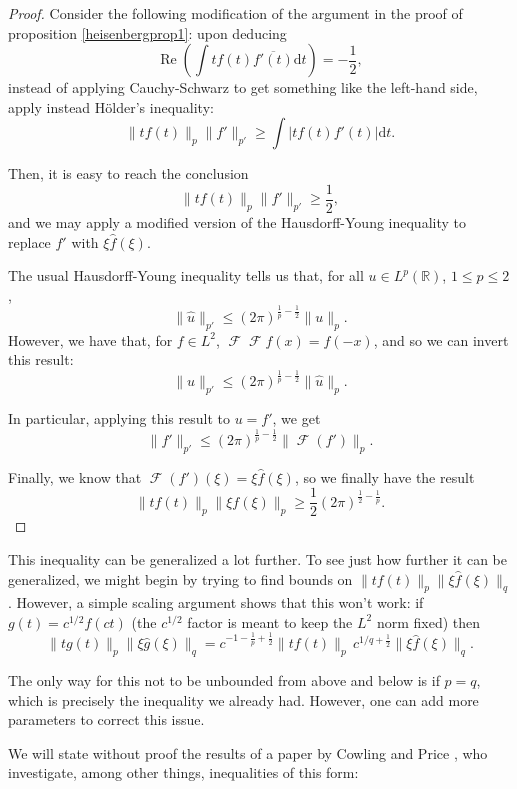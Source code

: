 \documentclass{amsart}
\newcommand{\R}{\mathbb{R}}
\newcommand{\dd}{\mathrm{d}}
\DeclareMathOperator{\F}{\mathcal{F}}
\DeclareMathOperator{\re}{Re}
\begin{document}
\begin{proof}
Consider the following modification of the argument in the proof of proposition \ref{heisenbergprop1}: upon deducing
\[\re\left( \int t f(t) \overline{f'(t)} \dd t \right) = -\frac12,\]
instead of applying Cauchy-Schwarz to get something like the left-hand side, apply instead Hölder's inequality:
\[ \lVert t f(t) \rVert_p \lVert f' \rVert_{p'} \geq \int \lvert t f(t) f'(t) \rvert \dd t.\]

Then, it is easy to reach the conclusion
\[\lVert t f(t) \rVert_p \lVert f' \rVert_{p'} \geq \frac12,\]
and we may apply a modified version of the Hausdorff-Young inequality to replace $f'$ with $\xi \hat f(\xi)$.

The usual Hausdorff-Young inequality tells us that, for all $u \in L^p(\R)$, $1 \leq p \leq 2$,
\[ \lVert \hat u \rVert_{p'} \leq (2 \pi)^{\frac1p - \frac12} \lVert u \rVert_p.\]
However, we have that, for $f \in L^2$, $\F \F f(x) = f(-x)$, and so we can invert this result:
\[ \lVert u \rVert_{p'} \leq (2 \pi)^{\frac1p - \frac12} \lVert \hat u \rVert_p.\]

In particular, applying this result to $u = f'$, we get
\[ \lVert f' \rVert_{p'} \leq (2 \pi)^{\frac1p - \frac12} \lVert \F(f') \rVert_p.\]

Finally, we know that $\F(f')(\xi) = \xi \hat f(\xi)$, so we finally have the result
\[ \lVert t f(t) \rVert_p \lVert \xi f(\xi) \rVert_{p} \geq \frac12 (2 \pi)^{\frac12 - \frac1p}.\]
\end{proof}

This inequality can be generalized a lot further. To see just how further it can be generalized, we might begin by trying to find bounds on $\lVert t f(t) \rVert_p \lVert \xi \hat f(\xi) \rVert_q$. However, a simple scaling argument shows that this won't work: if $g(t) = c^{1/2} f(ct)$ (the $c^{1/2}$ factor is meant to keep the $L^2$ norm fixed) then
\begin{equation}\label{scaling}
\lVert t g(t) \rVert_p \lVert \xi \hat g(\xi) \rVert_q = c^{-1-\frac1p + \frac12} \lVert t f(t) \rVert_p \, c^{1/q + \frac12} \lVert \xi \hat f(\xi) \rVert_q.
\end{equation}

The only way for this not to be unbounded from above and below is if $p = q$, which is precisely the inequality we already had. However, one can add more parameters to correct this issue.

We will state without proof the results of a paper by Cowling and Price \cite{cp}, who investigate, among other things, inequalities of this form:
\end{document}
